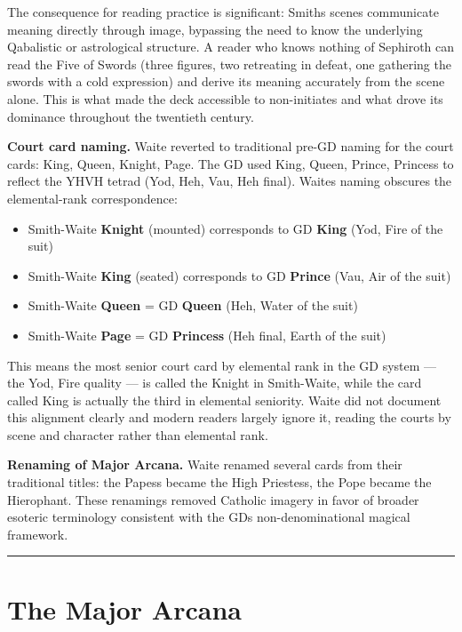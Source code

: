 The consequence for reading practice is significant: Smith\textquotesingle s scenes communicate meaning directly through image, bypassing the need to know the underlying Qabalistic or astrological structure. A reader who knows nothing of Sephiroth can read the Five of Swords (three figures, two retreating in defeat, one gathering the swords with a cold expression) and derive its meaning accurately from the scene alone. This is what made the deck accessible to non-initiates and what drove its dominance throughout the twentieth century.

\textbf{Court card naming.} Waite reverted to traditional pre-GD naming for the court cards: King, Queen, Knight, Page. The GD used King, Queen, Prince, Princess to reflect the YHVH tetrad (Yod, Heh, Vau, Heh final). Waite\textquotesingle s naming obscures the elemental-rank correspondence:

\begin{itemize}
\tightlist
\item
  Smith-Waite \textbf{Knight} (mounted) corresponds to GD \textbf{King} (Yod, Fire of the suit)
\item
  Smith-Waite \textbf{King} (seated) corresponds to GD \textbf{Prince} (Vau, Air of the suit)
\item
  Smith-Waite \textbf{Queen} = GD \textbf{Queen} (Heh, Water of the suit)
\item
  Smith-Waite \textbf{Page} = GD \textbf{Princess} (Heh final, Earth of the suit)
\end{itemize}

This means the most senior court card by elemental rank in the GD system --- the Yod, Fire quality --- is called the Knight in Smith-Waite, while the card called King is actually the third in elemental seniority. Waite did not document this alignment clearly and modern readers largely ignore it, reading the courts by scene and character rather than elemental rank.

\textbf{Renaming of Major Arcana.} Waite renamed several cards from their traditional titles: the Papess became the High Priestess, the Pope became the Hierophant. These renamings removed Catholic imagery in favor of broader esoteric terminology consistent with the GD\textquotesingle s non-denominational magical framework.

\begin{center}\rule{0.5\linewidth}{0.5pt}\end{center}

\section{The Major Arcana}\label{the-major-arcana}

